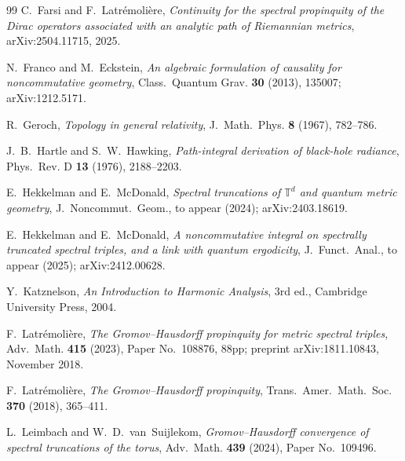 \documentclass[11pt,a4paper]{article}
\theoremstyle{plain}
\theoremstyle{definition}
\begin{document}
\begin{thebibliography}{99}
C.~Farsi and F.~Latr\'emoli\`ere,
\newblock \emph{Continuity for the spectral propinquity of the Dirac
operators associated with an analytic path of Riemannian metrics},
\newblock arXiv:2504.11715, 2025.

N.~Franco and M.~Eckstein,
\newblock \emph{An algebraic formulation of causality for
noncommutative geometry},
\newblock Class.~Quantum Grav. \textbf{30} (2013), 135007;
\newblock arXiv:1212.5171.

R.~Geroch,
\newblock \emph{Topology in general relativity},
\newblock J.~Math.~Phys. \textbf{8} (1967), 782--786.

J.~B.~Hartle and S.~W.~Hawking,
\newblock \emph{Path-integral derivation of black-hole radiance},
\newblock Phys.~Rev. D \textbf{13} (1976), 2188--2203.

E.~Hekkelman and E.~McDonald,
\newblock \emph{Spectral truncations of $\mathbb{T}^{d}$ and quantum
metric geometry},
\newblock J.~Noncommut.~Geom., to appear (2024);
\newblock arXiv:2403.18619.

E.~Hekkelman and E.~McDonald,
\newblock \emph{A noncommutative integral on spectrally truncated
spectral triples, and a link with quantum ergodicity},
\newblock J.~Funct.~Anal., to appear (2025);
\newblock arXiv:2412.00628.

Y.~Katznelson,
\newblock \emph{An Introduction to Harmonic Analysis},
\newblock 3rd ed., Cambridge University Press, 2004.

F.~Latr\'emoli\`ere,
\newblock \emph{The Gromov--Hausdorff propinquity for metric spectral
triples},
\newblock Adv.~Math. \textbf{415} (2023), Paper No.~108876, 88pp;
\newblock preprint arXiv:1811.10843, November 2018.

F.~Latr\'emoli\`ere,
\newblock \emph{The Gromov--Hausdorff propinquity},
\newblock Trans.~Amer.~Math.~Soc. \textbf{370} (2018), 365--411.

L.~Leimbach and W.~D.~van~Suijlekom,
\newblock \emph{Gromov--Hausdorff convergence of spectral truncations
of the torus},
\newblock Adv.~Math. \textbf{439} (2024), Paper No.~109496.


\end{thebibliography}
\end{document}
